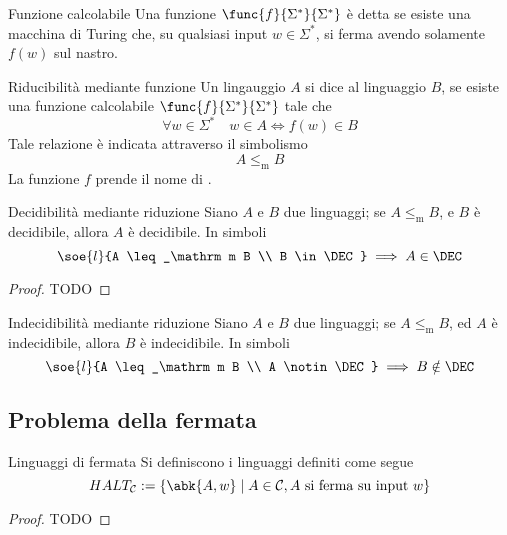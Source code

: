 \documentclass[a4paper, 12pt]{report}
\begin{document}
    \begin{frameddefn}{Funzione calcolabile}
        Una funzione $\func{f}{\Sigma^*}{\Sigma^*}$ è detta  se esiste una macchina di Turing che, su qualsiasi input $w \in \Sigma^*$, si ferma avendo solamente $f(w)$ sul nastro.
    \end{frameddefn}

    \begin{frameddefn}{Riducibilità mediante funzione}
        Un lingauggio $A$ si dice  al linguaggio $B$, se esiste una funzione calcolabile $\func{f}{\Sigma^*}{\Sigma^*}$ tale che $$\forall w \in \Sigma^* \quad w \in A \iff f(w) \in B$$ Tale relazione è indicata attraverso il simbolismo $$A \leq_\mathrm m B$$ La funzione $f$ prende il nome di .
    \end{frameddefn}

    \begin{framedthm}{Decidibilità mediante riduzione}
        Siano $A$ e $B$ due linguaggi; se $A \leq_\mathrm m B$, e $B$ è decidibile, allora $A$ è decidibile. In simboli $$\soe{l}{A \leq_\mathrm m B \\ B \in \DEC} \implies A \in \DEC$$
    \end{framedthm}

    \begin{proof}
        TODO
    \end{proof}

    \begin{framedcor}{Indecidibilità mediante riduzione}
        Siano $A$ e $B$ due linguaggi; se $A \leq_\mathrm m B$, ed $A$ è indecidibile, allora $B$ è indecidibile. In simboli $$\soe{l}{A \leq_\mathrm m B \\ A \notin \DEC} \implies B \notin \DEC$$
    \end{framedcor}

    \subsection{Problema della fermata}

    \begin{frameddefn}{Linguaggi di fermata}
        Si definiscono  i linguaggi definiti come segue $$HALT_\mathcal{C} := \{\abk{A, w} \mid A \in \mathcal{C} , A \ \textrm{si ferma su input} \ w\}$$
    \end{frameddefn}

    \begin{proof}
        TODO
    \end{proof}
\end{document}

